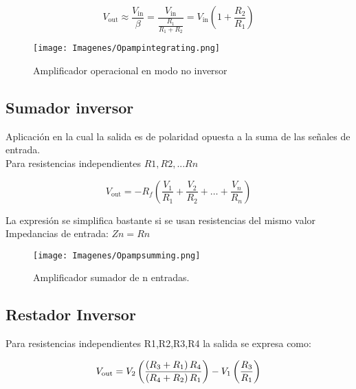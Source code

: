 \documentclass{article}
\begin{document}
\begin{equation}
{\displaystyle V_{\text{out}}\approx {\frac {V_{\text{in}}}{\beta }}={\frac {V_{\text{in}}}{\frac {R_{\text{1}}}{R_{\text{1}}+R_{\text{2}}}}}=V_{\text{in}}\left(1+{\frac {R_{2}}{R_{1}}}\right)}
\end{equation}

\begin{figure}[h!]
    \centering
    \texttt{[image: Imagenes/Opampintegrating.png]}
    \caption{Amplificador operacional en modo no inversor\citep{AmplificadorOperacional}}
    \label{fig:OpAmpInvert}
\end{figure}

\subsection{Sumador inversor}

Aplicación en la cual la salida es de polaridad opuesta a la suma de las señales de entrada.\citep{AmplificadorOperacional}\\

Para resistencias independientes $R1, R2,... Rn
$

\begin{equation}
{\displaystyle V_{\mathrm {out} }=-R_{f}\left({\frac {V_{1}}{R_{1}}}+{\frac {V_{2}}{R_{2}}}+\dots +{\frac {V_{n}}{R_{n}}}\right)}
\end{equation}

La expresión se simplifica bastante si se usan resistencias del mismo valor
Impedancias de entrada: $Zn = Rn$\citep{AmplificadorOperacional}\\

\begin{figure}
    \centering
    \texttt{[image: Imagenes/Opampsumming.png]}
    \caption{Amplificador sumador de n entradas.\citep{AmplificadorOperacional}}
    \label{fig:opAmpSumming}
\end{figure}


\subsection{Restador Inversor}

Para resistencias independientes R1,R2,R3,R4 la salida se expresa como:\citep{AmplificadorOperacional}

\begin{equation}[h!]
    {\displaystyle V_{\mathrm {out} }=V_{2}\left({\left(R_{3}+R_{1}\right)R_{4} \over \left(R_{4}+R_{2}\right)R_{1}}\right)-V_{1}\left({R_{3} \over R_{1}}\right)}
\end{equation}
\end{document}
